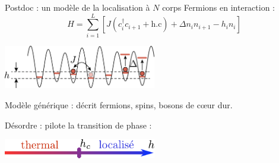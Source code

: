 \begin{frame}{Postdoc : un modèle de la localisation à $N$ corps}
Fermions en interaction :
\[
	H = \sum_{i=1}^L \left[ J (c_i^\dagger c_{i+1} + \text{h.c}) + \Delta n_i n_{i+1} - h_i n_i \right]
\]

{
\centering
\includegraphics[width=0.5\textwidth]{img/1_travaux/XXZ_cold_atoms}

}
Modèle générique : décrit fermions, spins, bosons de cœur dur.

Désordre : pilote la transition de phase :

{
\centering
\includegraphics[width=0.5\textwidth]{img/1_travaux/arrow}

}
\end{frame}

